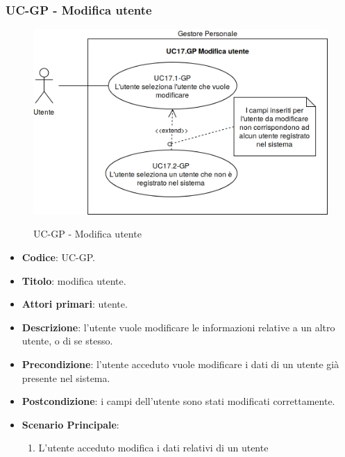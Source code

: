 \subsubsection{UC\theuccount-GP - Modifica utente}
		\begin{figure}[H]
			\centering
				\includegraphics[width=\columnwidth]{img/casi_d'uso/UC17.png}\\
			\caption{UC\theuccount-GP - Modifica utente}
		\end{figure}
	\begin{itemize}
		\item \textbf{Codice}: UC\theuccount-GP.
		\item \textbf{Titolo}: modifica utente.
		\item \textbf{Attori primari}: utente.
		\item \textbf{Descrizione}: l’utente vuole modificare le informazioni relative a un altro utente, o di se stesso.
		\item \textbf{Precondizione}: l'utente acceduto vuole modificare i dati di un utente già presente nel sistema.
		\item \textbf{Postcondizione}: i campi dell'utente sono stati modificati correttamente.
		\item \textbf{Scenario Principale}:
		\begin{enumerate}
			\item L'utente acceduto modifica i dati relativi di un utente
		\end{enumerate}
	\end{itemize}
	
